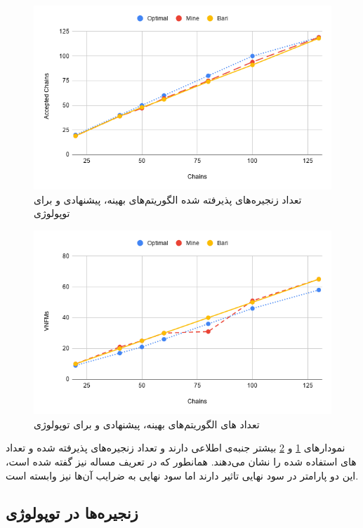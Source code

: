 \begin{figure}[h!]
\center\includegraphics[scale=.5]{images/chart-3}
\caption{تعداد زنجیره‌های پذیرفته شده الگوریتم‌های بهینه، پیشنهادی و \cite{Bari2015} برای توپولوژی }
\label{fig.8}
\end{figure}

\begin{figure}[h!]
\center\includegraphics[scale=.5]{images/chart-4}
\caption{تعداد های الگوریتم‌های بهینه، پیشنهادی و \cite{Bari2015} برای توپولوژی }
\label{fig.9}
\end{figure}

نمودارهای \ref{fig.8} و \ref{fig.9}
بیشتر جنبه‌ی اطلاعی دارند و تعداد زنجیره‌های پذیرفته شده و تعداد
های
استفاده شده را نشان می‌دهند.
همانطور که در تعریف مساله نیز گفته شده است، این دو پارامتر در سود نهایی تاثیر دارند
اما سود نهایی به ضرایب آن‌ها نیز وابسته است.

\subsection{زنجیره‌ها در توپولوژی }

